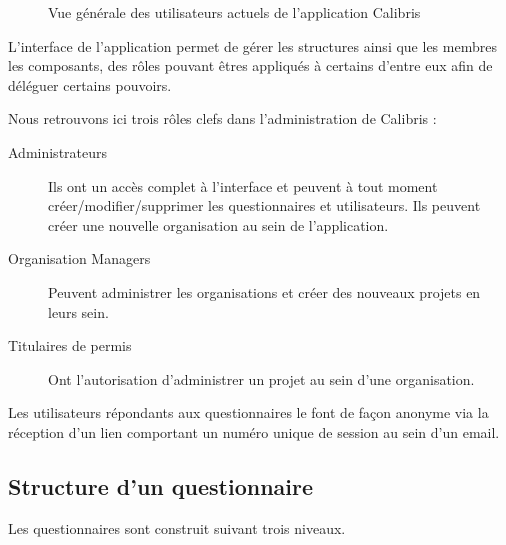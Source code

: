 \documentclass[12pt,a4paper]{book}
\begin{document}
\begin{figure}[h]
   \centering
{}
\caption{Vue générale des utilisateurs actuels de l'application Calibris} 
\label{fig.calibris_clients}
\end{figure}

L'interface de l'application permet de gérer les structures ainsi que les membres les composants, des rôles pouvant êtres appliqués à certains d'entre eux afin de déléguer certains pouvoirs. 

Nous retrouvons ici trois rôles clefs dans l'administration de Calibris :
\begin{description}
  \item[Administrateurs] Ils ont un accès complet à l'interface et peuvent à tout moment créer/modifier/supprimer les questionnaires et utilisateurs. Ils peuvent créer une nouvelle organisation au sein de l'application. 
  \item[Organisation Managers] Peuvent administrer les organisations et créer des nouveaux projets en leurs sein.
  \item[Titulaires de permis] Ont l'autorisation d'administrer un projet au sein d'une organisation.
\end{description}
  
Les utilisateurs répondants aux questionnaires le font de façon anonyme via la réception d'un lien comportant un numéro unique de session au sein d'un email.

\subsection{Structure d'un questionnaire}

Les questionnaires sont construit suivant trois niveaux. 
\end{document}
